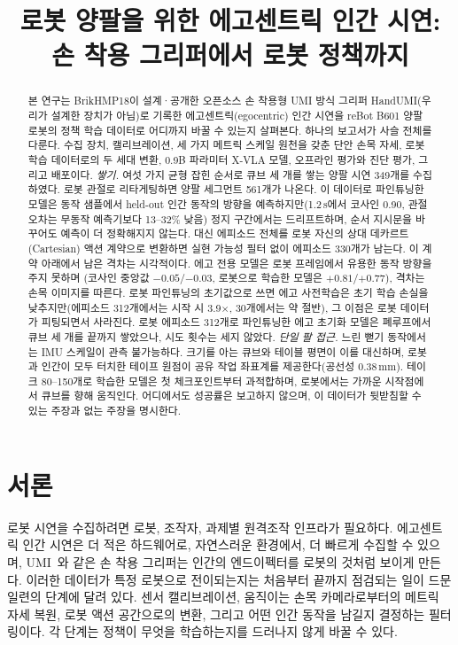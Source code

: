 \documentclass[conference,10pt]{IEEEtran}
\newcommand{\mm}{\,mm\xspace}
\begin{document}
\title{로봇 양팔을 위한 에고센트릭 인간 시연:\\손 착용 그리퍼에서 로봇 정책까지}
\author{
}
\maketitle

\begin{abstract}
본 연구는 BrikHMP18이 설계·공개한 오픈소스 손 착용형 UMI 방식 그리퍼 HandUMI(우리가 설계한 장치가 아님)로 기록한 에고센트릭(egocentric)
인간 시연을 reBot B601 양팔 로봇의 정책 학습 데이터로 어디까지 바꿀 수 있는지 살펴본다. 하나의 보고서가 사슬 전체를 다룬다. 수집
장치, 캘리브레이션, 세 가지 메트릭 스케일 원천을 갖춘 단안 손목 자세, 로봇 학습 데이터로의 두 세대 변환, 0.9B 파라미터 X-VLA 모델,
오프라인 평가와 진단 평가, 그리고 배포이다. \emph{쌓기.} 여섯 가지 균형 잡힌 순서로 큐브 세 개를 쌓는 양팔 시연 349개를 수집하였다.
로봇 관절로 리타게팅하면 양팔 세그먼트 561개가 나온다. 이 데이터로 파인튜닝한 모델은 동작 샘플에서 held-out 인간 동작의 방향을
예측하지만(1.2\,s에서 코사인 0.90, 관절 오차는 무동작 예측기보다 13--32\% 낮음) 정지 구간에서는 드리프트하며, 순서 지시문을 바꾸어도
예측이 더 정확해지지 않는다. 대신 에피소드 전체를 로봇 자신의 상대 데카르트(Cartesian) 액션 계약으로 변환하면 실현 가능성 필터 없이
에피소드 330개가 남는다. 이 계약 아래에서 남은 격차는 시각적이다. 에고 전용 모델은 로봇 프레임에서 유용한 동작 방향을 주지 못하며
(코사인 중앙값 $-0.05$/$-0.03$, 로봇으로 학습한 모델은 $+0.81$/$+0.77$), 격차는 손목 이미지를 따른다. 로봇 파인튜닝의 초기값으로 쓰면
에고 사전학습은 초기 학습 손실을 낮추지만(에피소드 312개에서는 시작 시 3.9$\times$, 30개에서는 약 절반), 그 이점은 로봇 데이터가
피팅되면서 사라진다. 로봇 에피소드 312개로 파인튜닝한 에고 초기화 모델은 폐루프에서 큐브 세 개를 끝까지 쌓았으나, 시도 횟수는
세지 않았다. \emph{단일 팔 접근.} 느린 뻗기 동작에서는 IMU 스케일이 관측 불가능하다. 크기를 아는 큐브와 테이블 평면이 이를
대신하며, 로봇과 인간이 모두 터치한 테이프 원점이 공유 작업 좌표계를 제공한다(공선성 0.38\mm). 테이크 80--150개로 학습한 모델은
첫 체크포인트부터 과적합하며, 로봇에서는 가까운 시작점에서 큐브를 향해 움직인다. 어디에서도 성공률은 보고하지 않으며, 이 데이터가
뒷받침할 수 있는 주장과 없는 주장을 명시한다.
\end{abstract}

\section{서론}\label{sec:intro}
로봇 시연을 수집하려면 로봇, 조작자, 과제별 원격조작 인프라가 필요하다. 에고센트릭 인간 시연은 더 적은 하드웨어로, 자연스러운
환경에서, 더 빠르게 수집할 수 있으며, UMI~\cite{chi2024umi}와 같은 손 착용 그리퍼는 인간의 엔드이펙터를 로봇의 것처럼 보이게 만든다.
이러한 데이터가 특정 로봇으로 전이되는지는 처음부터 끝까지 점검되는 일이 드문 일련의 단계에 달려 있다. 센서 캘리브레이션, 움직이는
손목 카메라로부터의 메트릭 자세 복원, 로봇 액션 공간으로의 변환, 그리고 어떤 인간 동작을 남길지 결정하는 필터링이다. 각 단계는
정책이 무엇을 학습하는지를 드러나지 않게 바꿀 수 있다.
\end{document}
